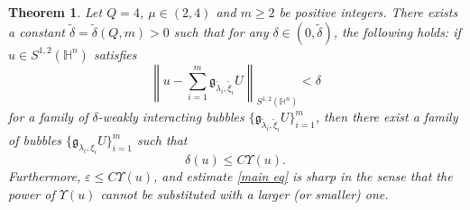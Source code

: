 \documentclass[11pt]{article}
\newtheorem{theorem}{Theorem}[section]
\begin{document}
\begin{theorem}\label{main thm}
Let $Q=4$, $\mu\in(2,4)$ and $m\geq2$ be positive integers.
There exists a constant $\tilde{\delta}=\tilde{\delta}(Q, m)>0$ such that for any $\delta \in (0, \tilde{\delta})$, the following holds:
   if $u\in S^{1,2}(\mathbb{H}^{n})$ satisfies
   \begin{equation*}
     \left\|u-\mathop{\sum}\limits_{i=1}^{m}\mathfrak{g}_{\tilde{\lambda}_i,\tilde{\xi}_i}U
\right\|_{S^{1,2}(\mathbb{H}^{n})}<\delta
   \end{equation*}
   for a family of $\delta$-weakly interacting bubbles $\big\{\mathfrak{g}_{\tilde{\lambda}_i , \tilde{\xi }_i} U\big\}_{i=1}^{m}$,
then there exist a family of bubbles $\big\{\mathfrak{g}_{\lambda_i ,\xi_i } U\big\}_{i=1}^m $ such that
\begin{equation}\label{main eq}
\delta(u) \leq C \Upsilon(u).
\end{equation}
Furthermore, $\varepsilon \leq C \Upsilon(u)$,
and estimate \eqref{main eq} is sharp in the sense that the power of $\Upsilon(u)$
 cannot be substituted with a larger (or smaller) one.
\end{theorem}
\end{document}
